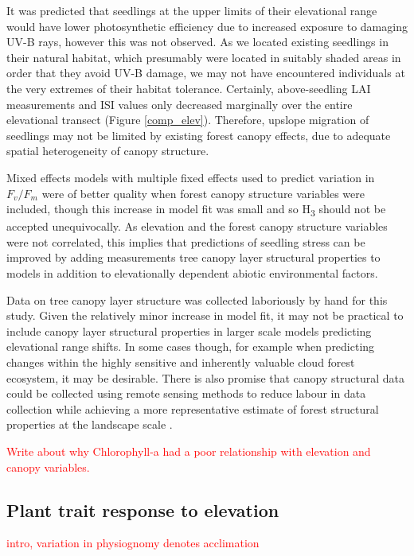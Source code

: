 \documentclass[a4paper, 11pt]{article}
\newcommand{\todo}[1]{\textcolor{red}{#1}}   %
\begin{document}
It was predicted that seedlings at the upper limits of their elevational range would have lower photosynthetic efficiency due to increased exposure to damaging UV-B rays, however this was not observed. As we located existing seedlings in their natural habitat, which presumably were located in suitably shaded areas in order that they avoid UV-B damage, we may not have encountered individuals at the very extremes of their habitat tolerance. Certainly, above-seedling LAI measurements and ISI values only decreased marginally over the entire elevational transect (Figure \ref{comp_elev}). Therefore, upslope migration of seedlings may not be limited by existing forest canopy effects, due to adequate spatial heterogeneity of canopy structure.

Mixed effects models with multiple fixed effects used to predict variation in $F_v/F_m$ were of better quality when forest canopy structure variables were included, though this increase in model fit was small and so H\textsubscript{3} should not be accepted unequivocally. As elevation and the forest canopy structure variables were not correlated, this implies that predictions of seedling stress can be improved by adding measurements tree canopy layer structural properties to models in addition to elevationally dependent abiotic environmental factors. 

Data on tree canopy layer structure was collected laboriously by hand for this study. Given the relatively minor increase in model fit, it may not be practical to include canopy layer structural properties in larger scale models predicting elevational range shifts. In some cases though, for example when predicting changes within the highly sensitive and inherently valuable cloud forest ecosystem, it may be desirable. There is also promise that canopy structural data could be collected using remote sensing methods to reduce labour in data collection while achieving a more representative estimate of forest structural properties at the landscape scale \citep{Messinger2016, Palace2015}.

\todo{Write about why Chlorophyll-a had a poor relationship with elevation and canopy variables.}

\subsection{Plant trait response to elevation}

\todo{intro, variation in physiognomy denotes acclimation}
\end{document}
